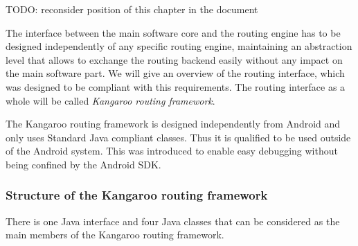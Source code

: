 TODO: reconsider position of this chapter in the document\newline

The interface between the main software core and the routing engine has to be designed independently of any specific routing engine, maintaining an abstraction level that allows to exchange the routing backend easily without any impact on the main software part. We will give an overview of the routing interface, which was designed to be compliant with this requirements. The routing interface as a whole will be called \emph{Kangaroo routing framework}.\newline

The Kangaroo routing framework is designed independently from Android and only uses Standard Java compliant classes. Thus it is qualified to be used outside of the Android system. This was introduced to enable easy debugging without being confined by the Android SDK.

\subsubsection{Structure of the Kangaroo routing framework}

There is one Java interface and four Java classes that can be considered as the main members of the Kangaroo routing framework.

